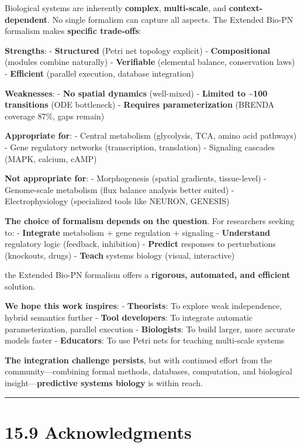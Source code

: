 Biological systems are inherently \textbf{complex},
\textbf{multi-scale}, and \textbf{context-dependent}. No single
formalism can capture all aspects. The Extended Bio-PN formalism makes
\textbf{specific trade-offs}:

\textbf{Strengths}: - \textbf{Structured} (Petri net topology explicit)
- \textbf{Compositional} (modules combine naturally) -
\textbf{Verifiable} (elemental balance, conservation laws) -
\textbf{Efficient} (parallel execution, database integration)

\textbf{Weaknesses}: - \textbf{No spatial dynamics} (well-mixed) -
\textbf{Limited to \textasciitilde100 transitions} (ODE bottleneck) -
\textbf{Requires parameterization} (BRENDA coverage 87\%, gaps remain)

\textbf{Appropriate for}: - Central metabolism (glycolysis, TCA, amino
acid pathways) - Gene regulatory networks (transcription, translation) -
Signaling cascades (MAPK, calcium, cAMP)

\textbf{Not appropriate for}: - Morphogenesis (spatial gradients,
tissue-level) - Genome-scale metabolism (flux balance analysis better
suited) - Electrophysiology (specialized tools like NEURON, GENESIS)

\textbf{The choice of formalism depends on the question}. For
researchers seeking to: - \textbf{Integrate} metabolism + gene
regulation + signaling - \textbf{Understand} regulatory logic (feedback,
inhibition) - \textbf{Predict} responses to perturbations (knockouts,
drugs) - \textbf{Teach} systems biology (visual, interactive)

the Extended Bio-PN formalism offers a \textbf{rigorous, automated, and
efficient} solution.

\textbf{We hope this work inspires}: - \textbf{Theorists}: To explore
weak independence, hybrid semantics further - \textbf{Tool developers}:
To integrate automatic parameterization, parallel execution -
\textbf{Biologists}: To build larger, more accurate models faster -
\textbf{Educators}: To use Petri nets for teaching multi-scale systems

\textbf{The integration challenge persists}, but with continued effort
from the community---combining formal methods, databases, computation,
and biological insight---\textbf{predictive systems biology} is within
reach.

\begin{center}\rule{0.5\linewidth}{0.5pt}\end{center}

\hypertarget{acknowledgments}{%
\section{15.9 Acknowledgments}\label{acknowledgments}}

